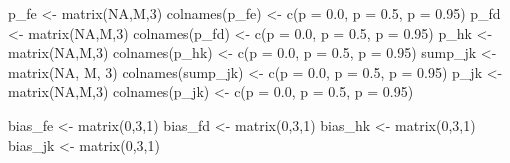 \documentclass[
]{article}
\newenvironment{Shaded}{\begin{snugshade}}{\end{snugshade}}
\newcommand{\ConstantTok}[1]{\textcolor[rgb]{0.00,0.00,0.00}{#1}}
\newcommand{\DecValTok}[1]{\textcolor[rgb]{0.00,0.00,0.81}{#1}}
\newcommand{\FunctionTok}[1]{\textcolor[rgb]{0.00,0.00,0.00}{#1}}
\newcommand{\NormalTok}[1]{#1}
\newcommand{\OtherTok}[1]{\textcolor[rgb]{0.56,0.35,0.01}{#1}}
\newcommand{\StringTok}[1]{\textcolor[rgb]{0.31,0.60,0.02}{#1}}
\begin{document}
\begin{Shaded}
\begin{Highlighting}[]
\NormalTok{p\_fe }\OtherTok{\textless{}{-}} \FunctionTok{matrix}\NormalTok{(}\ConstantTok{NA}\NormalTok{,M,}\DecValTok{3}\NormalTok{)}
\FunctionTok{colnames}\NormalTok{(p\_fe) }\OtherTok{\textless{}{-}} \FunctionTok{c}\NormalTok{(}\StringTok{\textquotesingle{}p = 0.0\textquotesingle{}}\NormalTok{, }\StringTok{\textquotesingle{}p = 0.5\textquotesingle{}}\NormalTok{, }\StringTok{\textquotesingle{}p = 0.95\textquotesingle{}}\NormalTok{)}
\NormalTok{p\_fd }\OtherTok{\textless{}{-}} \FunctionTok{matrix}\NormalTok{(}\ConstantTok{NA}\NormalTok{,M,}\DecValTok{3}\NormalTok{)}
\FunctionTok{colnames}\NormalTok{(p\_fd) }\OtherTok{\textless{}{-}} \FunctionTok{c}\NormalTok{(}\StringTok{\textquotesingle{}p = 0.0\textquotesingle{}}\NormalTok{, }\StringTok{\textquotesingle{}p = 0.5\textquotesingle{}}\NormalTok{, }\StringTok{\textquotesingle{}p = 0.95\textquotesingle{}}\NormalTok{)}
\NormalTok{p\_hk }\OtherTok{\textless{}{-}} \FunctionTok{matrix}\NormalTok{(}\ConstantTok{NA}\NormalTok{,M,}\DecValTok{3}\NormalTok{)}
\FunctionTok{colnames}\NormalTok{(p\_hk) }\OtherTok{\textless{}{-}} \FunctionTok{c}\NormalTok{(}\StringTok{\textquotesingle{}p = 0.0\textquotesingle{}}\NormalTok{, }\StringTok{\textquotesingle{}p = 0.5\textquotesingle{}}\NormalTok{, }\StringTok{\textquotesingle{}p = 0.95\textquotesingle{}}\NormalTok{)}
\NormalTok{sump\_jk }\OtherTok{\textless{}{-}} \FunctionTok{matrix}\NormalTok{(}\ConstantTok{NA}\NormalTok{, M, }\DecValTok{3}\NormalTok{)}
\FunctionTok{colnames}\NormalTok{(sump\_jk) }\OtherTok{\textless{}{-}} \FunctionTok{c}\NormalTok{(}\StringTok{\textquotesingle{}p = 0.0\textquotesingle{}}\NormalTok{, }\StringTok{\textquotesingle{}p = 0.5\textquotesingle{}}\NormalTok{, }\StringTok{\textquotesingle{}p = 0.95\textquotesingle{}}\NormalTok{)}
\NormalTok{p\_jk }\OtherTok{\textless{}{-}} \FunctionTok{matrix}\NormalTok{(}\ConstantTok{NA}\NormalTok{,M,}\DecValTok{3}\NormalTok{)}
\FunctionTok{colnames}\NormalTok{(p\_jk) }\OtherTok{\textless{}{-}} \FunctionTok{c}\NormalTok{(}\StringTok{\textquotesingle{}p = 0.0\textquotesingle{}}\NormalTok{, }\StringTok{\textquotesingle{}p = 0.5\textquotesingle{}}\NormalTok{, }\StringTok{\textquotesingle{}p = 0.95\textquotesingle{}}\NormalTok{)}

\NormalTok{bias\_fe }\OtherTok{\textless{}{-}} \FunctionTok{matrix}\NormalTok{(}\DecValTok{0}\NormalTok{,}\DecValTok{3}\NormalTok{,}\DecValTok{1}\NormalTok{)}
\NormalTok{bias\_fd }\OtherTok{\textless{}{-}} \FunctionTok{matrix}\NormalTok{(}\DecValTok{0}\NormalTok{,}\DecValTok{3}\NormalTok{,}\DecValTok{1}\NormalTok{)}
\NormalTok{bias\_hk }\OtherTok{\textless{}{-}} \FunctionTok{matrix}\NormalTok{(}\DecValTok{0}\NormalTok{,}\DecValTok{3}\NormalTok{,}\DecValTok{1}\NormalTok{)}
\NormalTok{bias\_jk }\OtherTok{\textless{}{-}} \FunctionTok{matrix}\NormalTok{(}\DecValTok{0}\NormalTok{,}\DecValTok{3}\NormalTok{,}\DecValTok{1}\NormalTok{)}


\end{Highlighting}
\end{Shaded}
\end{document}
